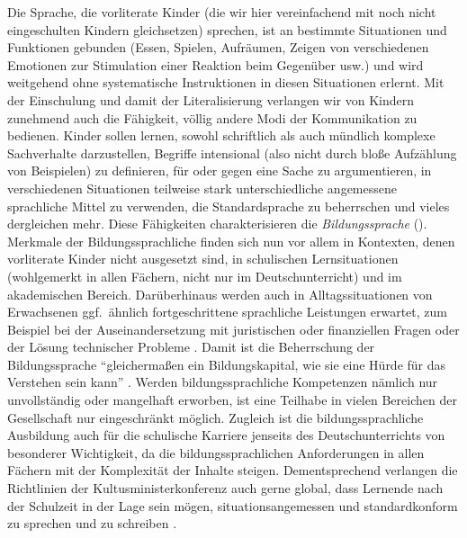 Die Sprache, die vorliterate Kinder (die wir hier vereinfachend mit noch nicht eingeschulten Kindern gleichsetzen) sprechen, ist an bestimmte Situationen und Funktionen gebunden (Essen, Spielen, Aufräumen, Zeigen von verschiedenen Emotionen zur Stimulation einer Reaktion beim Gegenüber usw.) und wird weitgehend ohne systematische Instruktionen in diesen Situationen erlernt.
Mit der Einschulung und damit der Literalisierung verlangen wir von Kindern zunehmend auch die Fähigkeit, völlig andere Modi der Kommunikation zu bedienen.
Kinder sollen lernen, sowohl schriftlich als auch mündlich komplexe Sachverhalte darzustellen, Begriffe intensional (also nicht durch bloße Aufzählung von Beispielen) zu definieren, für oder gegen eine Sache zu argumentieren, in verschiedenen Situationen teilweise stark unterschiedliche angemessene sprachliche Mittel zu verwenden, die Standardsprache zu beherrschen und vieles dergleichen mehr.
Diese Fähigkeiten charakterisieren die \textit{Bildungssprache} (\zB \citealt{Feilke2012}).
Merkmale der Bildungssprachliche finden sich nun vor allem in Kontexten, denen vorliterate Kinder nicht ausgesetzt sind, \zB in schulischen Lernsituationen (wohlgemerkt in allen Fächern, nicht nur im Deutschunterricht) und im akademischen Bereich.
Darüberhinaus werden auch in Alltagssituationen von Erwachsenen ggf.\ ähnlich fortgeschrittene sprachliche Leistungen erwartet, zum Beispiel bei der Auseinandersetzung mit juristischen oder finanziellen Fragen oder der Lösung technischer Probleme \citep[5]{Feilke2012}.
Damit ist die Beherrschung der Bildungssprache "`gleichermaßen ein Bildungskapital, wie sie eine Hürde für das Verstehen sein kann"' \citep[11]{Feilke2012}.
Werden bildungssprachliche Kompetenzen nämlich nur unvollständig oder mangelhaft erworben, ist eine Teilhabe in vielen Bereichen der Gesellschaft nur eingeschränkt möglich.
Zugleich ist die bildungssprachliche Ausbildung auch für die schulische Karriere jenseits des Deutschunterrichts von besonderer Wichtigkeit, da die bildungssprachlichen Anforderungen in allen Fächern mit der Komplexität der Inhalte steigen.
Dementsprechend verlangen die Richtlinien der Kultusministerkonferenz auch gerne global, dass Lernende nach der Schulzeit in der Lage sein mögen, situationsangemessen und standardkonform zu sprechen und zu schreiben \citep[6]{Eisenberg2004}.

